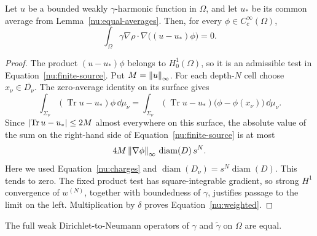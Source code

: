 \begin{lemma}\label{nu:weighted-identity}
Let \(u\) be a bounded weakly \(\gamma\)-harmonic function in
\(\Omega\), and let \(u_*\) be its common average from
Lemma~\ref{nu:equal-averages}. Then, for every
\(\phi\in C_c^\infty(\Omega)\),
\begin{equation}\label{nu:weighted}
 \int_\Omega\gamma\nabla\rho\cdot
       \nabla\bigl((u-u_*)\phi\bigr)=0.
\end{equation}
\end{lemma}

\begin{proof}
The product \((u-u_*)\phi\) belongs to \(H^1_0(\Omega)\),
so it is an admissible test in Equation~\eqref{nu:finite-source}.
Put \(M=\left\lVert u\right\rVert_\infty\). For each depth-\(N\) cell choose
\(x_\nu\in\overline{D_\nu}\). The zero-average identity on its
surface gives
\[
 \int_{\Sigma_\nu}(\operatorname{Tr}u-u_*)\phi\,\dd\mu_\nu
 =\int_{\Sigma_\nu}(\operatorname{Tr}u-u_*)
       \bigl(\phi-\phi(x_\nu)\bigr)\,\dd\mu_\nu.
\]
Since \(\left\lvert \operatorname{Tr}u-u_*\right\rvert\le2M\) almost everywhere on this surface,
the absolute value of the sum on the right-hand side of
Equation~\eqref{nu:finite-source} is at most
\begin{equation}\label{nu:diameter-error}
 4M\left\lVert \nabla\phi\right\rVert_\infty\,\operatorname{diam}(D)\,s^N.
\end{equation}
Here we used Equation~\eqref{nu:charges} and
\(\operatorname{diam}(D_\nu)=s^N\operatorname{diam}(D)\).
This tends to zero. The fixed product test has square-integrable
gradient, so strong \(H^1\) convergence of \(w^{(N)}\), together
with boundedness of \(\gamma\), justifies passage to the limit on
the left. Multiplication by \(\delta\) proves
Equation~\eqref{nu:weighted}.
\end{proof}

\begin{proposition}\label{nu:identical-dn}
The full weak Dirichlet-to-Neumann operators of \(\gamma\) and
\(\widetilde\gamma\) on \(\Omega\) are equal.
\end{proposition}

